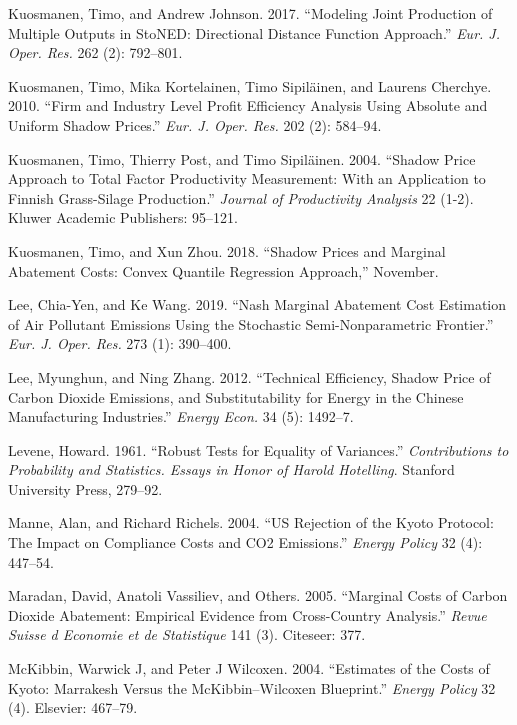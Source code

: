 \documentclass[12pt,]{article}
\begin{document}
\leavevmode\hypertarget{ref-Kuosmanen2017}{}%
Kuosmanen, Timo, and Andrew Johnson. 2017. ``Modeling Joint Production of Multiple Outputs in StoNED: Directional Distance Function Approach.'' \emph{Eur. J. Oper. Res.} 262 (2): 792--801.

\leavevmode\hypertarget{ref-Kuosmanen2010}{}%
Kuosmanen, Timo, Mika Kortelainen, Timo Sipiläinen, and Laurens Cherchye. 2010. ``Firm and Industry Level Profit Efficiency Analysis Using Absolute and Uniform Shadow Prices.'' \emph{Eur. J. Oper. Res.} 202 (2): 584--94.

\leavevmode\hypertarget{ref-Kuosmanen2004}{}%
Kuosmanen, Timo, Thierry Post, and Timo Sipiläinen. 2004. ``Shadow Price Approach to Total Factor Productivity Measurement: With an Application to Finnish Grass-Silage Production.'' \emph{Journal of Productivity Analysis} 22 (1-2). Kluwer Academic Publishers: 95--121.

\leavevmode\hypertarget{ref-Kuosmanen2018b}{}%
Kuosmanen, Timo, and Xun Zhou. 2018. ``Shadow Prices and Marginal Abatement Costs: Convex Quantile Regression Approach,'' November.

\leavevmode\hypertarget{ref-Lee2019}{}%
Lee, Chia-Yen, and Ke Wang. 2019. ``Nash Marginal Abatement Cost Estimation of Air Pollutant Emissions Using the Stochastic Semi-Nonparametric Frontier.'' \emph{Eur. J. Oper. Res.} 273 (1): 390--400.

\leavevmode\hypertarget{ref-Lee2012}{}%
Lee, Myunghun, and Ning Zhang. 2012. ``Technical Efficiency, Shadow Price of Carbon Dioxide Emissions, and Substitutability for Energy in the Chinese Manufacturing Industries.'' \emph{Energy Econ.} 34 (5): 1492--7.

\leavevmode\hypertarget{ref-Levene1961}{}%
Levene, Howard. 1961. ``Robust Tests for Equality of Variances.'' \emph{Contributions to Probability and Statistics. Essays in Honor of Harold Hotelling}. Stanford University Press, 279--92.

\leavevmode\hypertarget{ref-Manne2004}{}%
Manne, Alan, and Richard Richels. 2004. ``US Rejection of the Kyoto Protocol: The Impact on Compliance Costs and CO2 Emissions.'' \emph{Energy Policy} 32 (4): 447--54.

\leavevmode\hypertarget{ref-Maradan2005}{}%
Maradan, David, Anatoli Vassiliev, and Others. 2005. ``Marginal Costs of Carbon Dioxide Abatement: Empirical Evidence from Cross-Country Analysis.'' \emph{Revue Suisse d Economie et de Statistique} 141 (3). Citeseer: 377.

\leavevmode\hypertarget{ref-McKibbin2004}{}%
McKibbin, Warwick J, and Peter J Wilcoxen. 2004. ``Estimates of the Costs of Kyoto: Marrakesh Versus the McKibbin--Wilcoxen Blueprint.'' \emph{Energy Policy} 32 (4). Elsevier: 467--79.
\end{document}
